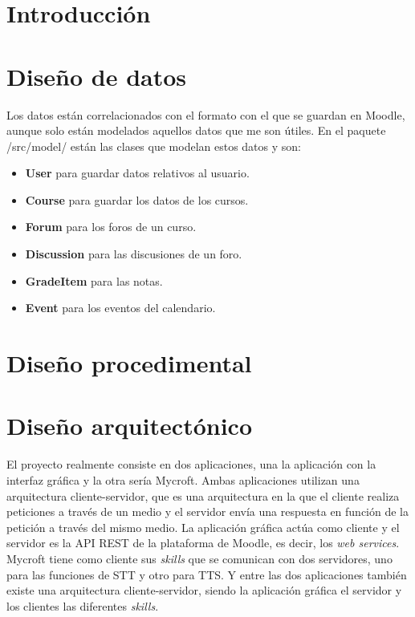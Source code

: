 
\section{Introducción}

\section{Diseño de datos}

Los datos están correlacionados con el formato con el que se guardan en Moodle, aunque solo están modelados aquellos datos que me son útiles. En el paquete /src/model/ están las clases que modelan estos datos y son:
\begin{itemize}
	\item \textbf{User} para guardar datos relativos al usuario.
	\item \textbf{Course} para guardar los datos de los cursos.
	\item \textbf{Forum} para los foros de un curso.
	\item \textbf{Discussion} para las discusiones de un foro.
	\item \textbf{GradeItem} para las notas.
	\item \textbf{Event} para los eventos del calendario.
\end{itemize}

\section{Diseño procedimental}



\section{Diseño arquitectónico}

El proyecto realmente consiste en dos aplicaciones, una la aplicación con la interfaz gráfica y la otra sería Mycroft. Ambas aplicaciones utilizan una arquitectura cliente-servidor, que es una arquitectura en la que el cliente realiza peticiones a través de un medio y el servidor envía una respuesta en función de la petición a través del mismo medio. La aplicación gráfica actúa como cliente y el servidor es la API REST de la plataforma de Moodle, es decir, los \textit{web services}. Mycroft tiene como cliente sus \textit{skills} que se comunican con dos servidores, uno para las funciones de STT y otro para TTS. Y entre las dos aplicaciones también existe una arquitectura cliente-servidor, siendo la aplicación gráfica el servidor y los clientes las diferentes \textit{skills}.